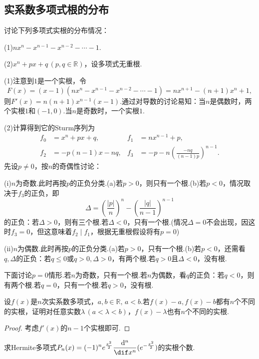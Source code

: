 \subsection{实系数多项式根的分布}
\begin{prob}[2]
	讨论下列多项式实根的分布情况：

	(1)$nx^n-x^{n-1}-x^{n-2}-\cdots-1$.

	(2)$x^n+px+q\,(p,q\in\mathbb{R})$，设多项式无重根.
\end{prob}
\begin{sol}
	(1)注意到$1$是一个实根，令
	\[
		F(x)=(x-1)(nx^n-x^{n-1}-x^{n-2}-\cdots-1)=nx^{n+1}-(n+1)x^n+1,
	\]
	则$F'(x)=n(n+1)x^{n-1}(x-1)$.通过对导数的讨论易知：当$n$是偶数时，两个实根$1$和$(-1,0)$.当$n$是奇数时，一个实根$1$.

	(2)计算得到它的Sturm序列为
	\begin{align*}
		f_0 & =x^n+px+q,    & f_1 & =nx^{n-1}+p,                                \\
		f_2 & =-p(n-1)x-nq, & f_3 & =-p-n\left(\frac{-nq}{(n-1)p}\right)^{n-1}.
	\end{align*}
	先设$p\ne 0$，按$n$的奇偶性讨论：

	(i)$n$为奇数.此时再按$p$的正负分类.(a)若$p>0$，则只有一个根.(b)若$p<0$，情况取决于$f_3$的正负，即
	\[
		\Delta=\left(\frac{|p|}{n}\right)^n-\left(\frac{|q|}{n-1}\right)^{n-1}
	\]
	的正负：若$\Delta>0$，则有三个根.若$\Delta<0$，只有一个根.(情况$\Delta=0$不会出现，因这时$f_3=0$，但这意味着$f_2\mid f_1$，根据无重根假设将有$p=0$)

	(ii)$n$为偶数.此时再按$p$的正负分类.(a)若$p>0$，只有一个根.(b)若$p<0$，还需看$q,\Delta$的正负：若$q\le 0$或$q>0,\Delta>0$，有两个根.若$q>0$且$\Delta<0$，没有根.

	下面讨论$p=0$情形.若$n$为奇数，只有一个根.若$n$为偶数，看$q$的正负：若$q<0$，则有两个根.若$q=0$，只有一个根.若$q>0$，没有根.
\end{sol}
\begin{prob}[5]
	设$f(x)$是$n$次实系数多项式，$a,b\in\mathbb{R},\,a<b$.若$f(x)-a,f(x)-b$都有$n$个不同的实根，证明对任意实数$\lambda\,(a<\lambda<b)$，$f(x)-\lambda$也有$n$个不同的实根.
\end{prob}
\begin{proof}
	考虑$f'(x)$的$n-1$个实根即可.
\end{proof}
\begin{prob}[6]
	求Hermite多项式$\displaystyle P_n(x)=(-1)^ne^{\frac{x^2}{2}}\frac{\mathrm{d}^n}{\dif x^n}(e^{-\frac{x^2}{2}})$的实根个数.
\end{prob}
